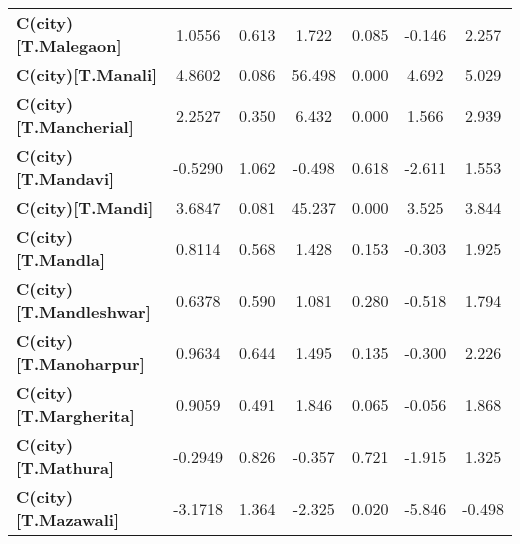 \begin{center}
\begin{tabular}{lcccccc}
\textbf{C(city)[T.Malegaon]}                                                                        &       1.0556  &        0.613     &     1.722  &         0.085        &       -0.146    &        2.257     \\
\textbf{C(city)[T.Manali]}                                                                          &       4.8602  &        0.086     &    56.498  &         0.000        &        4.692    &        5.029     \\
\textbf{C(city)[T.Mancherial]}                                                                      &       2.2527  &        0.350     &     6.432  &         0.000        &        1.566    &        2.939     \\
\textbf{C(city)[T.Mandavi]}                                                                         &      -0.5290  &        1.062     &    -0.498  &         0.618        &       -2.611    &        1.553     \\
\textbf{C(city)[T.Mandi]}                                                                           &       3.6847  &        0.081     &    45.237  &         0.000        &        3.525    &        3.844     \\
\textbf{C(city)[T.Mandla]}                                                                          &       0.8114  &        0.568     &     1.428  &         0.153        &       -0.303    &        1.925     \\
\textbf{C(city)[T.Mandleshwar]}                                                                     &       0.6378  &        0.590     &     1.081  &         0.280        &       -0.518    &        1.794     \\
\textbf{C(city)[T.Manoharpur]}                                                                      &       0.9634  &        0.644     &     1.495  &         0.135        &       -0.300    &        2.226     \\
\textbf{C(city)[T.Margherita]}                                                                      &       0.9059  &        0.491     &     1.846  &         0.065        &       -0.056    &        1.868     \\
\textbf{C(city)[T.Mathura]}                                                                         &      -0.2949  &        0.826     &    -0.357  &         0.721        &       -1.915    &        1.325     \\
\textbf{C(city)[T.Mazawali]}                                                                        &      -3.1718  &        1.364     &    -2.325  &         0.020        &       -5.846    &       -0.498     \\

\end{tabular}
\end{center}
